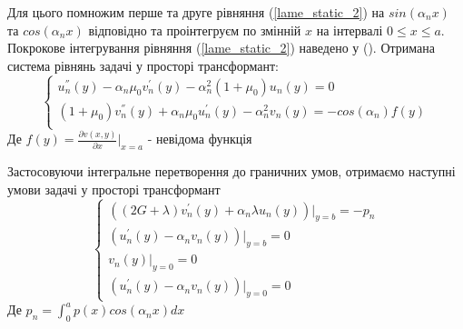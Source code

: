 Для цього помножим перше та друге рівняння (\ref{lame_static_2}) на $sin(\alpha_n x)$ та $cos(\alpha_n x)$ відповідно та проінтегруєм по змінній $x$ на інтервалі $0 \le x \le a$.
Покрокове інтегрування рівняння (\ref{lame_static_2}) наведено у ().
Отримана система рівнянь задачі у просторі трансформант:
\begin{equation}\label{transf_static_2}
    \begin{cases}
        u_n^{''}(y) - \alpha_n \mu_0 v_n^{'}(y) - \alpha_n^2 (1 + \mu_0) u_n(y) = 0 \\
        (1 + \mu_0) v_n^{''}(y) + \alpha_n \mu_0 u_n^{'}(y)  - \alpha_n^2 v_n(y) = -cos(\alpha_n) f(y) \\
    \end{cases}
\end{equation}
Де $f(y) = \frac{\partial v(x,y)}{\partial x}|_{x=a}$ - невідома функція

Застосовуючи інтегральне перетворення до граничних умов,
отримаємо наступні умови задачі у просторі трансформант
\begin{equation}\label{transf_bound_static_2}
    \begin{cases}
        \left( (2G + \lambda)v_n^{'}(y) + \alpha_n \lambda u_n(y) \right)|_{y=b} = -p_n \\
        \left(u_n^{'}(y) - \alpha_n v_n(y)  \right)|_{y=b} = 0 \\
        v_n(y)|_{y=0} = 0 \\
        \left(u_n^{'}(y) - \alpha_n v_n(y)  \right)|_{y=0} = 0
    \end{cases}
\end{equation}
Де $p_n = \int_{0}^{a} p(x) cos(\alpha_n x) dx$

